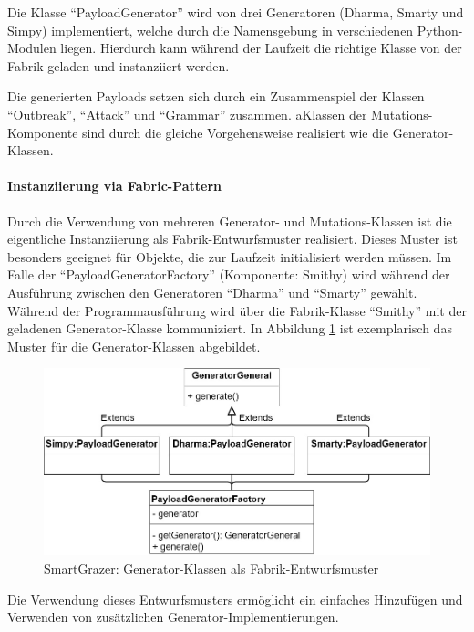 Die Klasse ``PayloadGenerator'' wird von drei Generatoren (Dharma, Smarty und Simpy) implementiert, welche durch die Namensgebung in verschiedenen Python-Modulen liegen. Hierdurch kann während der Laufzeit die richtige Klasse von der Fabrik geladen und instanziiert werden.

Die generierten Payloads setzen sich durch ein Zusammenspiel der Klassen ``Outbreak'', ``Attack'' und ``Grammar'' zusammen. aKlassen der Mutations-Komponente sind durch die gleiche Vorgehensweise realisiert wie die Generator-Klassen.
\FloatBarrier
\paragraph{Instanziierung via Fabric-Pattern}

Durch die Verwendung von mehreren Generator- und Mutations-Klassen ist die eigentliche Instanziierung als Fabrik-Entwurfsmuster realisiert. Dieses Muster ist besonders geeignet für Objekte, die zur Laufzeit initialisiert werden müssen. Im Falle der ``PayloadGeneratorFactory'' (Komponente: Smithy) wird während der Ausführung zwischen den Generatoren ``Dharma'' und ``Smarty'' gewählt. Während der Programmausführung wird über die Fabrik-Klasse ``Smithy'' mit der geladenen Generator-Klasse kommuniziert. In Abbildung \ref{fig:SmartGrazer-Fabric-Pattern} ist exemplarisch das Muster für die Generator-Klassen abgebildet.

\begin{figure}[htbp] 
	\centering
	\includegraphics[width=.9\textwidth]{contents/images/SmartGrazerFabricPattern}
	\caption{SmartGrazer: Generator-Klassen als Fabrik-Entwurfsmuster}
	\label{fig:SmartGrazer-Fabric-Pattern}
\end{figure}

Die Verwendung dieses Entwurfsmusters ermöglicht  ein einfaches Hinzufügen und Verwenden von zusätzlichen Generator-Implementierungen.

\FloatBarrier

